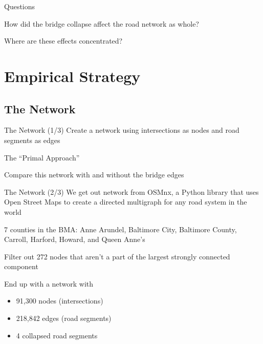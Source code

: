 \documentclass{beamer}
\numberwithin{figure}{section} %
\numberwithin{table}{section} %
\begin{document}
\begin{frame}{Questions}
    \begin{center}
        How did the bridge collapse affect the road network as whole?

        Where are these effects concentrated?
    \end{center}
\end{frame}


\section{Empirical Strategy}

\subsection{The Network}

\begin{frame}{The Network (1/3)}
    Create a network using intersections as nodes and road segments as edges

    The ``Primal Approach'' {\tiny \parencite{Porta06}}

    Compare this network with and without the bridge edges
\end{frame}

\begin{frame}{The Network (2/3)}
    We get out network from OSMnx, a Python library that uses Open Street Maps to create a directed multigraph for any road system in the world {\tiny \parencite{Boeing17}}

    7 counties in the BMA: Anne Arundel, Baltimore City, Baltimore County, Carroll, Harford, Howard, and Queen Anne's

    Filter out 272 nodes that aren't a part of the largest strongly connected component

    End up with a network with
    \begin{itemize}
        \item 91,300 nodes (intersections)
        \item 218,842 edges (road segments)
        \item 4 collapsed road segments
    \end{itemize}
\end{frame}
\end{document}
